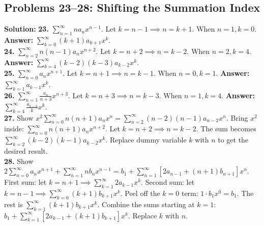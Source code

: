 \documentclass[11pt, letterpaper]{article}
\theoremstyle{definition}
\theoremstyle{remark}
\begin{document}
\subsection{Problems 23--28: Shifting the Summation Index}
\textbf{Solution:}
\textbf{23.} $\sum_{n=1}^{\infty} n a_n x^{n-1}$. Let $k = n-1 \implies n = k+1$. When $n=1, k=0$. \textbf{Answer:} $\sum_{k=0}^{\infty} (k+1) a_{k+1} x^k$.
\\[4pt]
\textbf{24.} $\sum_{n=2}^{\infty} n(n-1) a_n x^{n+2}$. Let $k = n+2 \implies n = k-2$. When $n=2, k=4$. \textbf{Answer:} $\sum_{k=4}^{\infty} (k-2)(k-3) a_{k-2} x^k$.
\\[4pt]
\textbf{25.} $\sum_{n=0}^{\infty} a_n x^{n+1}$. Let $k = n+1 \implies n = k-1$. When $n=0, k=1$. \textbf{Answer:} $\sum_{k=1}^{\infty} a_{k-1} x^k$.
\\[4pt]
\textbf{26.} $\sum_{n=1}^{\infty} \frac{a_n}{n+3} x^{n+3}$. Let $k = n+3 \implies n = k-3$. When $n=1, k=4$. \textbf{Answer:} $\sum_{k=4}^{\infty} \frac{a_{k-3}}{k} x^k$.
\\[4pt]
\textbf{27.} Show $x^2 \sum_{n=0}^{\infty} n(n+1) a_n x^n = \sum_{n=2}^{\infty} (n-2)(n-1) a_{n-2} x^n$.
Bring $x^2$ inside: $\sum_{n=0}^{\infty} n(n+1) a_n x^{n+2}$. Let $k = n+2 \implies n = k-2$. The sum becomes $\sum_{k=2}^{\infty} (k-2)(k-1) a_{k-2} x^k$. Replace dummy variable $k$ with $n$ to get the desired result.
\\[4pt]
\textbf{28.} Show $2 \sum_{n=0}^{\infty} a_n x^{n+1} + \sum_{n=1}^{\infty} n b_n x^{n-1} = b_1 + \sum_{n=1}^{\infty} [2a_{n-1} + (n+1)b_{n+1}] x^n$.
First sum: let $k = n+1 \implies \sum_{k=1}^{\infty} 2 a_{k-1} x^k$.
Second sum: let $k = n-1 \implies \sum_{k=0}^{\infty} (k+1) b_{k+1} x^k$. Peel off the $k=0$ term: $1 \cdot b_1 x^0 = b_1$. The rest is $\sum_{k=1}^{\infty} (k+1) b_{k+1} x^k$.
Combine the sums starting at $k=1$: $b_1 + \sum_{k=1}^{\infty} [2 a_{k-1} + (k+1) b_{k+1}] x^k$. Replace $k$ with $n$.
\end{document}

